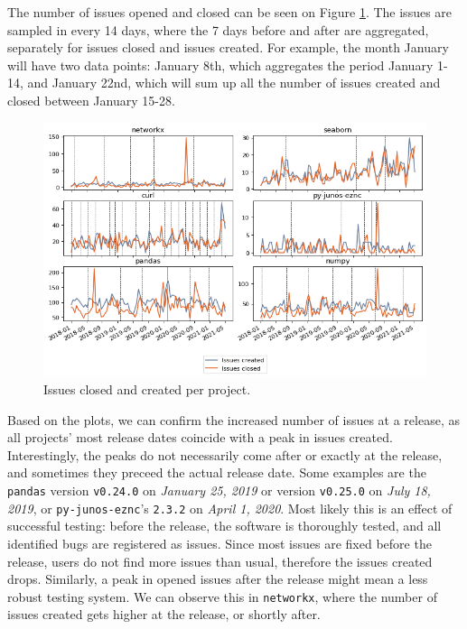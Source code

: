 The number of issues opened and closed can be seen on Figure \ref{fig:issues_created_closed}. The issues are sampled in every 14 days, where the 7 days before and after are aggregated, separately for issues closed and issues created. For example, the month January will have two data points: January 8th, which aggregates the period January 1-14, and January 22nd, which will sum up all the number of issues created and closed between January 15-28.

\begin{figure}
    \centering
    \includegraphics[width=\textwidth]{figures/qualitative/issues_closed_created/issues.png}
    \caption{Issues closed and created per project.}
    \label{fig:issues_created_closed}
\end{figure}

Based on the plots, we can confirm the increased number of issues at a release, as all projects' most release dates coincide with a peak in issues created. Interestingly, the peaks do not necessarily come after or exactly at the release, and sometimes they preceed the actual release date. Some examples are the \texttt{pandas} version \texttt{v0.24.0} on \textit{January 25, 2019} or version \texttt{v0.25.0} on \textit{July 18, 2019}, or \texttt{py-junos-eznc}'s \texttt{2.3.2} on \textit{April 1, 2020}. Most likely this is an effect of successful testing: before the release, the software is thoroughly tested, and all identified bugs are registered as issues. Since most issues are fixed before the release, users do not find more issues than usual, therefore the issues created drops. Similarly, a peak in opened issues after the release might mean a less robust testing system. We can observe this in \texttt{networkx}, where the number of issues created gets higher at the release, or shortly after.

